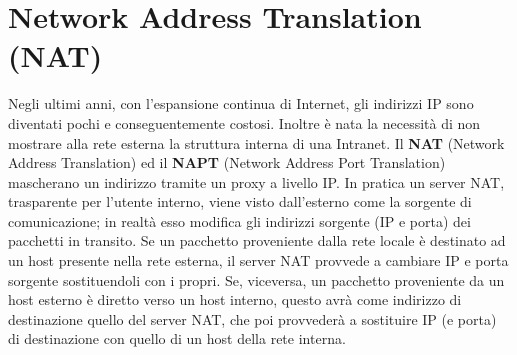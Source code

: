 \chapter{Network Address Translation (NAT)}
Negli ultimi anni, con l'espansione continua di Internet, gli indirizzi IP sono diventati pochi e conseguentemente costosi. Inoltre è nata la necessità di non mostrare alla rete esterna la struttura interna di una Intranet. Il \textbf{NAT} (Network Address Translation) ed il \textbf{NAPT} (Network Address Port Translation) mascherano un indirizzo tramite un proxy a livello IP. In pratica un server NAT, trasparente per l'utente interno, viene visto dall'esterno come la sorgente di comunicazione; in realtà esso modifica gli indirizzi sorgente (IP e porta) dei pacchetti in transito. Se un pacchetto proveniente dalla rete locale è destinato ad un host presente nella rete esterna, il server NAT provvede a cambiare IP e porta sorgente sostituendoli con i propri. Se, viceversa, un pacchetto proveniente da un host esterno è diretto verso un host interno, questo avrà come indirizzo di destinazione quello del server NAT, che poi provvederà a sostituire IP (e porta) di destinazione con quello di un host della rete interna.

